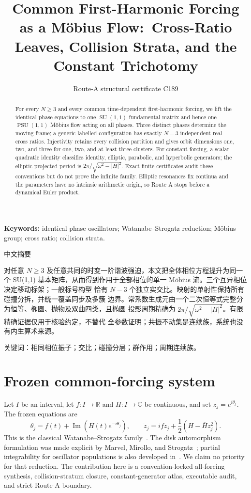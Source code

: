 \documentclass[8pt]{extarticle}
\title{Common First-Harmonic Forcing as a M\"obius Flow:\
Cross-Ratio Leaves, Collision Strata, and the Constant Trichotomy}
\author{Route-A structural certificate C189}
\date{}
\newcommand{\PSU}{\operatorname{PSU}}
\newcommand{\SU}{\operatorname{SU}}
\newcommand{\im}{\operatorname{Im}}
\begin{document}
\maketitle
\begin{abstract}
For every $N\ge3$ and every common time-dependent first-harmonic forcing,
we lift the identical phase equations to one $\SU(1,1)$ fundamental matrix
and hence one $\PSU(1,1)$ M\"obius flow acting on all phases.  Three distinct
phases determine the moving frame; a generic labelled configuration has
exactly $N-3$ independent real cross ratios.  Injectivity retains every
collision partition and gives orbit dimensions one, two, and three for one,
two, and at least three clusters.  For constant forcing, a scalar quadratic
identity classifies identity, elliptic, parabolic, and hyperbolic generators;
the elliptic projected period is $2\pi/\sqrt{\omega^2-|H|^2}$.  Exact finite
certificates audit these conventions but do not prove the infinite family.
Elliptic resonances fix continua and the parameters have no intrinsic
arithmetic origin, so Route A stops before a dynamical Euler product.
\end{abstract}
\noindent\textbf{Keywords:} identical phase oscillators; Watanabe--Strogatz
reduction; M\"obius group; cross ratio; collision strata.

\begin{otherlanguage}{chinese-simplified}
\begin{center}{\large 中文摘要}\end{center}
对任意 $N\ge3$ 及任意共同的时变一阶谐波强迫，本文把全体相位方程提升为同一个
\foreignlanguage{english}{SU(1,1)} 基本矩阵，从而得到作用于全部相位的单一
\foreignlanguage{english}{M\"obius} 流。三个互异相位决定移动标架；一般标号构型
恰有 $N-3$ 个独立实交比。映射的单射性保持所有碰撞分拆，并统一覆盖同步及多簇
边界。常系数生成元由一个二次恒等式完整分为恒等、椭圆、抛物及双曲四类，且椭圆
投影周期精确为 $2\pi/\sqrt{\omega^2-|H|^2}$。有限精确证据仅用于核验约定，不替代
全参数证明；共振不动集是连续族，系统也没有内生算术来源。

\noindent 关键词：相同相位振子；交比；碰撞分层；群作用；周期连续族。
\end{otherlanguage}

\section{Frozen common-forcing system}
Let $I$ be an interval, let $f:I\to\mathbb R$ and $H:I\to\mathbb C$ be
continuous, and set $z_j=e^{i\theta_j}$.  The frozen equations are
\begin{equation}
 \dot\theta_j=f(t)+\im\!\left(H(t)e^{-i\theta_j}\right),\qquad
 \dot z_j=ifz_j+\frac12\left(H-\overline H z_j^2\right).       \tag{1}
\end{equation}
This is the classical Watanabe--Strogatz family~\cite{WS1994}.  The disk
automorphism formulation was made explicit by Marvel, Mirollo, and
Strogatz~\cite{MMS2009}; partial integrability for oscillator populations is
also developed in~\cite{PR2008}.  We claim no priority for that reduction.
The contribution here is a convention-locked all-forcing synthesis,
collision-stratum closure, constant-generator atlas, executable audit, and
strict Route-A boundary.
\end{document}

